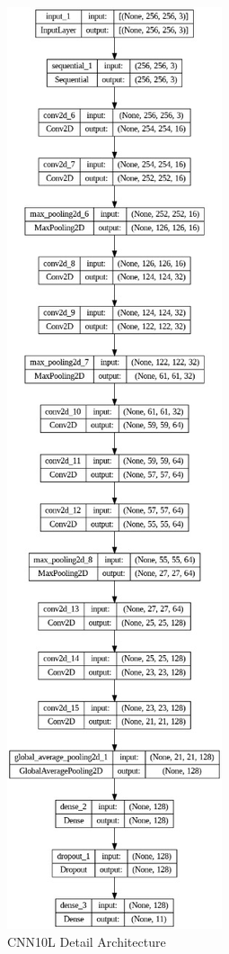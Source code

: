     \begin{figure}
        \centering
        \includegraphics[height=\textheight]{graphics//chapter3/cn10oiedwf.jpg}
        \caption{CNN10L Detail Architecture}
        \label{fig:cnn10l-detail-arch}
    \end{figure}

